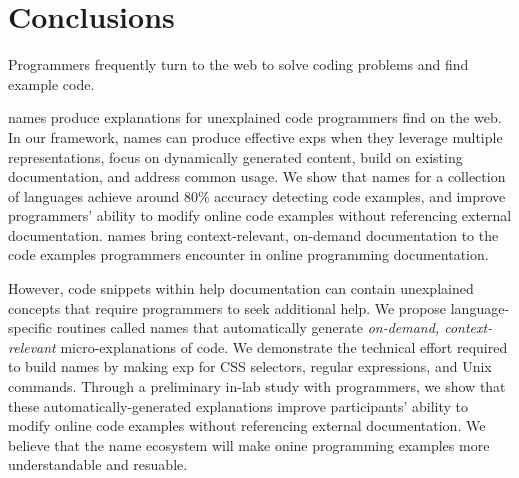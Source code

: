 \section{Conclusions}

Programmers frequently turn to the web to solve coding problems and find example code.
\begin{changes}
\Glspl{name} produce explanations for unexplained code programmers find on the web.
In our framework, \Glspl{name} can produce effective \glspl{exp} when they leverage multiple representations, focus on dynamically generated content, build on existing documentation, and address common usage.
We show that \Glspl{name} for a collection of languages achieve around 80\% accuracy detecting code examples, and improve programmers' ability to modify online code examples without referencing external documentation.
\Glspl{name} bring context-relevant, on-demand documentation to the code examples programmers encounter in online programming documentation.
\end{changes}

However, code snippets within  help documentation can contain unexplained concepts that require programmers to seek additional help.
We propose language-specific routines called \Glspl{name} that automatically generate \emph{on-demand, context-relevant} micro-explanations of code.
We demonstrate the technical effort required to build \Glspl{name} by making \gls{exp} for CSS selectors, regular expressions, and Unix commands.
Through a preliminary in-lab study with programmers, we show that these automatically-generated explanations improve participants' ability to modify online code examples without referencing external documentation.
We believe that the \Gls{name} ecosystem will make onine programming examples more understandable and resuable.
\fi

